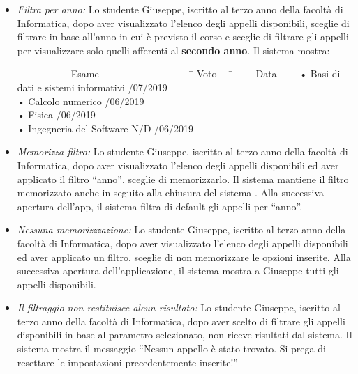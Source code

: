 \begin{itemize}
	\item \textit{Filtra per anno:}
	Lo studente Giuseppe, iscritto al terzo anno della facoltà di Informatica, dopo aver visualizzato l’elenco degli appelli disponibili, sceglie di filtrare in base all'anno in cui è previsto il corso e sceglie di filtrare gli appelli per visualizzare solo quelli afferenti al \textbf{secondo anno}. Il sistema mostra:
	\begin{tabbing}
		\hspace{1cm}-----------------Esame--------------------------- \= --Voto--- \= --------Data------ \kill
		\hspace{1cm} • Basi di dati e sistemi informativi  /07/2019 \\
		\hspace{1cm} • Calcolo numerico  /06/2019 \\
		\hspace{1cm} • Fisica  /06/2019 \\
		\hspace{1cm} • Ingegneria del Software \> N/D /06/2019  \\
	\end{tabbing}
	
	\item \textit{Memorizza filtro:}
	Lo studente Giuseppe, iscritto al terzo anno della facoltà di Informatica, dopo aver visualizzato l’elenco degli appelli disponibili ed aver applicato il filtro “anno”, sceglie di memorizzarlo. Il sistema mantiene il filtro memorizzato anche in seguito alla chiusura del sistema . Alla successiva apertura dell’app, il sistema filtra di default gli appelli per “anno”.
	
	\item \textit{Nessuna memorizzzazione:}
	Lo studente Giuseppe, iscritto al terzo anno della facoltà di Informatica, dopo aver visualizzato l’elenco degli appelli disponibili ed aver applicato un filtro, sceglie di non memorizzare le opzioni inserite. Alla successiva apertura dell'applicazione, il sistema mostra a Giuseppe tutti gli appelli disponibili.
	
	\item \textit{Il filtraggio non restituisce alcun risultato:}
	Lo studente Giuseppe, iscritto al terzo anno della facoltà di Informatica, dopo aver scelto di filtrare gli appelli disponibili in base al parametro selezionato, non riceve risultati dal sistema. Il sistema mostra il messaggio “Nessun appello è stato trovato. Si prega di resettare le impostazioni precedentemente inserite!”
\end{itemize}


